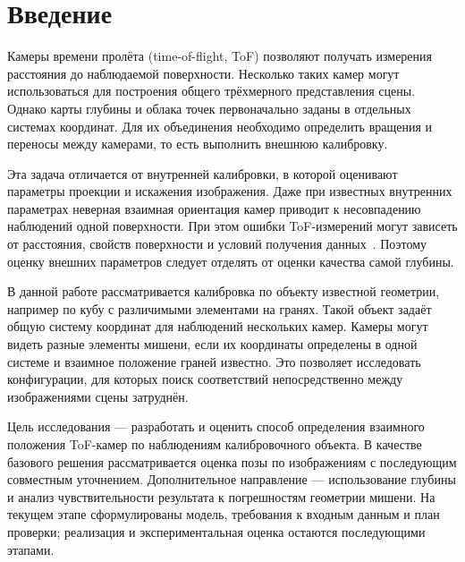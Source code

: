 \section{Введение}

Камеры времени пролёта (time-of-flight, ToF) позволяют получать измерения расстояния до наблюдаемой поверхности. Несколько таких камер могут использоваться для построения общего трёхмерного представления сцены. Однако карты глубины и облака точек первоначально заданы в отдельных системах координат. Для их объединения необходимо определить вращения и переносы между камерами, то есть выполнить внешнюю калибровку.

Эта задача отличается от внутренней калибровки, в которой оценивают параметры проекции и искажения изображения. Даже при известных внутренних параметрах неверная взаимная ориентация камер приводит к несовпадению наблюдений одной поверхности. При этом ошибки ToF-измерений могут зависеть от расстояния, свойств поверхности и условий получения данных~\cite{foix2011}. Поэтому оценку внешних параметров следует отделять от оценки качества самой глубины.

В данной работе рассматривается калибровка по объекту известной геометрии, например по кубу с различимыми элементами на гранях. Такой объект задаёт общую систему координат для наблюдений нескольких камер. Камеры могут видеть разные элементы мишени, если их координаты определены в одной системе и взаимное положение граней известно. Это позволяет исследовать конфигурации, для которых поиск соответствий непосредственно между изображениями сцены затруднён.

Цель исследования --- разработать и оценить способ определения взаимного положения ToF-камер по наблюдениям калибровочного объекта. В качестве базового решения рассматривается оценка позы по изображениям с последующим совместным уточнением. Дополнительное направление --- использование глубины и анализ чувствительности результата к погрешностям геометрии мишени. На текущем этапе сформулированы модель, требования к входным данным и план проверки; реализация и экспериментальная оценка остаются последующими этапами.
